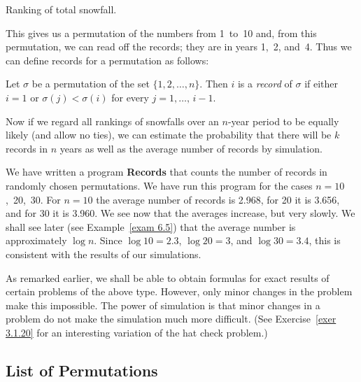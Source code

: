\begin{table}
\centering
{}
\caption{Ranking of total snowfall.}
\label{table 3.5}
\end{table}

This gives us a permutation of the numbers from 1~to~10 and, from this permutation, we
can read off the records; they are in years 1,~2, and~4.  Thus we can define records
for a permutation as follows:

\begin{definition}\label{def 3.3} Let $\sigma$ be a permutation of the set $\{1, 2, \ldots, n\}$.  
Then $i$ is a {\em record} of $\sigma$ if either $i = 1$ or $\sigma(j) < \sigma(i)$ for
every $j = 1,\ldots,\,i - 1$.
\end{definition}

Now if we regard all rankings of snowfalls over an $n$-year period to be equally
likely (and allow no ties), we can estimate the probability that there will be $k$
records in $n$ years as well as the average number of records by simulation.
\par
We have written a program {\bf Records} that
counts the number of records in randomly chosen permutations.  We have run this program 
for the cases $n = 10$,~20,~30. For $n = 10$ the average number of records is 2.968, 
for 20 it is 3.656, and for 30 it is 3.960. We see now that the averages increase, 
but very slowly.  We shall see later (see Example~\ref{exam 6.5}) that the average 
number is approximately $\log n$.  Since
$\log 10 = 2.3$,
$\log 20 = 3$, and
$\log 30 = 3.4$, this is consistent with the results of our simulations.
\par
As remarked earlier, we shall be able to obtain formulas for exact results of certain
problems of the above type.  However, only minor changes in the problem make this
impossible.  The power of simulation is that minor changes in a problem do not make
the simulation much more difficult.  (See Exercise~\ref{exer 3.1.20} for an interesting
variation of the hat check problem.)

\subsection*{List of Permutations}

